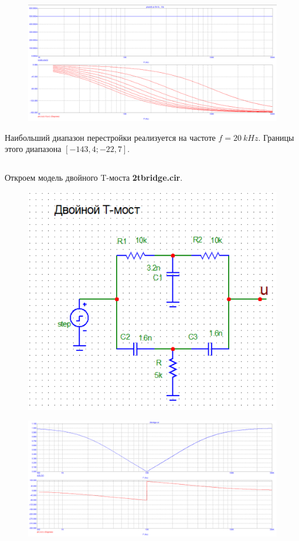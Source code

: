 \documentclass{article}
\begin{document}
\begin{figure}[H]
\centering
\includegraphics[scale=0.4]{phshift.png}
\label{fig:Image1}
\end{figure}

Наибольший диапазон перестройки реализуется на частоте $f = 20  \: kHz$. Границы этого диапазона $[-143,4; -22,7]$.

\subsection{}
Откроем модель двойного T-моста \textbf{2tbridge.cir}.

\begin{figure}[H]
\centering
\includegraphics[scale=0.4]{2tbridge_img.png}
\label{fig:Image1}
\end{figure}

\begin{figure}[H]
\centering
\includegraphics[scale=0.4]{2tbridge.png}
\label{fig:Image1}
\end{figure}
\end{document}
